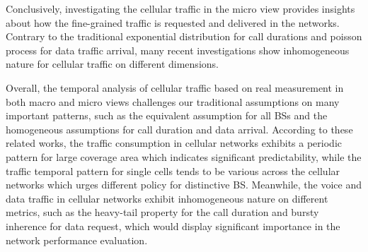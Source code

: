 {Conclusively, investigating the cellular traffic in the micro view provides insights about how the fine-grained traffic is requested and delivered in the networks. Contrary to the traditional exponential distribution for call durations and poisson process for data traffic arrival, many recent investigations show inhomogeneous nature for cellular traffic on different dimensions.

Overall, the temporal analysis of cellular traffic based on real measurement in both macro and micro views challenges our traditional assumptions on many important patterns, such as the equivalent assumption for all BSs and the homogeneous assumptions for call duration and data arrival. According to these related works, the traffic consumption in cellular networks exhibits a periodic pattern for large coverage area which indicates significant predictability, while the traffic temporal pattern for single cells tends to be various across the cellular networks which urges different policy for distinctive BS. Meanwhile, the voice and data traffic in cellular networks exhibit inhomogeneous nature on different metrics, such as the heavy-tail property for the call duration and bursty inherence for data request, which would display significant importance in the network performance evaluation.

}
